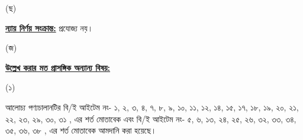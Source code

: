 \documentclass[12pt]{article}
\begin{document}
\begin{minipage}[t]{0.05\linewidth}
\hspace{1em}
\end{minipage}
\begin{minipage}[t]{0.05\linewidth}
(ছ)
\end{minipage}
\begin{minipage}[t]{0.90\linewidth}
\underline{\textbf{ন্যায় নির্ণয় সংক্রান্ত:}} প্রযোজ্য নয়।
\\
\end{minipage}
\begin{minipage}[t]{0.05\linewidth}
\hspace{1em}
\end{minipage}
\begin{minipage}[t]{0.05\linewidth}
(জ)
\end{minipage}
\begin{minipage}[t]{0.05\linewidth}
\end{minipage}
\begin{minipage}[t]{0.90\linewidth}
\underline{\textbf{উল্লেখ করার মত প্রাসঙ্গিক অন্যান্য বিষয়:}}
\end{minipage}
\begin{minipage}[t]{0.05\linewidth}
\hspace{1em}
\end{minipage}
\footnotesize
\begin{minipage}[t]{0.05\linewidth}
\hspace{1em}
\end{minipage}
\begin{minipage}[t]{0.05\linewidth}
(১)
\end{minipage}
\begin{minipage}[t]{0.85\linewidth}
আলোচ্য পণ্যচালানটির
বি/ই আইটেম নং-
১, ২, ৩, ৪,
৭, ৮, ৯, ১০, ১১, ১২, ১৪,
১৫, ১৭, ১৮, ১৯, ২০, ২১, ২২, ২৩,
২৯, ৩০, ৩১
{\srootz}, {\srootzd} এর শর্ত মোতাবেক
এবং
বি/ই আইটেম নং-
৫, ৬, ১৩, ২৪, ২৫, ২৬,
৩২, ৩৩, ৩৪, ৩৫, ৩৬, ৩৮
{\srooot}, {\sroootd}
এর শর্ত মোতাবেক
আমদানি করা হয়েছে।
\end{minipage}
\begin{minipage}[t]{0.05\linewidth}
\hspace{1em}
\end{minipage}
\begin{minipage}[t]{0.05\linewidth}
\hspace{1em}
\end{minipage}
\end{document}
